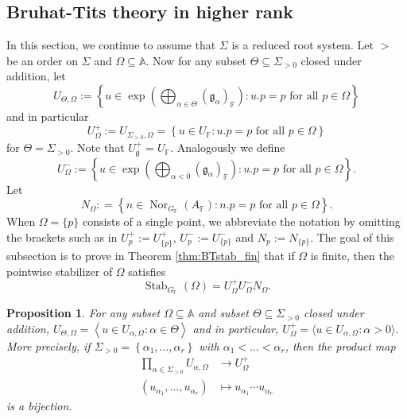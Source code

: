 \documentclass[12pt]{amsart}
\newcommand{\F}{\mathbb{F} }
\newcommand{\frakg}{\mathfrak{g}}
\newcommand{\A}{\mathbb{A}}
\numberwithin{equation}{section}
\newtheorem{proposition}[theorem]{Proposition}
\theoremstyle{remark} %
\begin{document}
\subsection{Bruhat-Tits theory in higher rank} \label{sec:BT_higher_rank}
		
		In this section, we continue to assume that $\Sigma$ is a reduced root system. Let $>$ be an order on $\Sigma$ and $\Omega \subseteq \A$. Now for any subset $\Theta \subseteq \Sigma_{>0}$ closed under addition, let
		$$
		U_{\Theta,\Omega} :=\left\{ u \in \exp\left( \bigoplus_{\alpha \in \Theta} (\frakg_\alpha)_\F \right) \colon  u.p=p \text{ for all } p \in \Omega \right\} 
		$$
		and in particular
		$$
		U_{\Omega}^+ := U_{\Sigma_{>0}, \Omega} = \left\{ u \in U_{\F} \colon u.p=p \text{ for all } p\in \Omega\right\}
		$$
		for $\Theta = \Sigma_{>0}$. Note that $U_{\emptyset}^+ = U_\F$. Analogously we define
		$$
		U_{\Omega}^- := \left\{ u \in \exp \left( \bigoplus_{\alpha <0} (\frakg_\alpha)_\F \right) \colon  u.p=p \text{ for all } p\in \Omega \right\}.
		$$
		Let
		$$
		N_\Omega : = \left\{ n \in \operatorname{Nor}_{G_\F}(A_\F) \colon n.p = p \text{ for all } p \in \Omega \right\}.
		$$
		When $\Omega = \{p\}$ consists of a single point, we abbreviate the notation by omitting the brackets such as in %
		$U_{p}^+ := U_{\{p\}}^+$, $U_{p}^- := U_{\{p\}}^-$ and $N_p := N_{\{p\}}$. The goal of this subsection is to prove in Theorem \ref{thm:BTstab_fin} that if $\Omega$ is finite, then the pointwise stabilizer of $\Omega$ satisfies
		$$
		\operatorname{Stab}_{G_\F}(\Omega) = U_{\Omega}^+ U_\Omega^- N_\Omega.
		$$
		\begin{proposition}\label{prop:BTUOmega}
			For any subset $\Omega \subseteq \A$ and subset $\Theta \subseteq \Sigma_{>0}$ closed under addition,
			$
			U_{\Theta, \Omega} = \left\langle u \in U_{\alpha,\Omega} \colon \alpha \in \Theta \right\rangle
			$
			and in particular, 
			$
			U_\Omega^+ = \langle  u \in U_{\alpha, \Omega} \colon  \alpha >0 \rangle.
			$
			More precisely, if $\Sigma_{>0} = \left\{ \alpha_1, \ldots , \alpha_r \right\}$ with $\alpha_1 < \ldots < \alpha_r$, then the product map
			\begin{align*}
				\prod_{\alpha \in \Sigma_{>0}} U_{\alpha, \Omega} & \to U_\Omega^+ \\
				(u_{\alpha_1}, \ldots , u_{\alpha_r}) & \mapsto u_{\alpha_1} \cdots u_{\alpha_r}
			\end{align*}
			is a bijection.
		\end{proposition}
\end{document}
